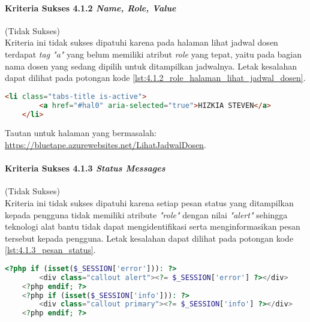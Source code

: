 \paragraph{Kriteria Sukses 4.1.2 \textit{Name, Role, Value}}
\label{par:kepatuhan_bluetape_kriteria_sukses_4.1.2}
(Tidak Sukses)\\

Kriteria ini tidak sukses dipatuhi karena pada halaman lihat jadwal dosen terdapat \textit{tag "a"} yang belum memiliki atribut \textit{role} yang tepat, yaitu pada bagian nama dosen yang sedang dipilih untuk ditampilkan jadwalnya. Letak kesalahan dapat dilihat pada potongan kode \ref{lst:4.1.2_role_halaman_lihat_jadwal_dosen}.

\begin{lstlisting}[frame=single, label={lst:4.1.2_role_halaman_lihat_jadwal_dosen}, language=HTML, caption=Kriteria Sukses 4.1.1 - Atribut \textit{Role} pada Halaman Lihat Jadwal Dosen]
    <li class="tabs-title is-active">
        <a href="#hal0" aria-selected="true">HIZKIA STEVEN</a>
    </li> 
\end{lstlisting}
Tautan untuk halaman yang bermasalah: \url{https://bluetape.azurewebsites.net/LihatJadwalDosen}.

\paragraph{Kriteria Sukses 4.1.3 \textit{Status Messages}}
\label{par:kepatuhan_bluetape_kriteria_sukses_4.1.3}
(Tidak Sukses)\\

Kriteria ini tidak sukses dipatuhi karena setiap pesan status yang ditampilkan kepada pengguna tidak memiliki atribute \textit{"role"} dengan nilai \textit{"alert"} sehingga teknologi alat bantu tidak dapat mengidentifikasi serta menginformasikan pesan tersebut kepada pengguna. Letak kesalahan dapat dilihat pada potongan kode \ref{lst:4.1.3_pesan_status}.

\begin{lstlisting}[frame=single, label={lst:4.1.3_pesan_status}, language=PHP, caption=Kriteria Sukses 4.1.3 - Atribut pada Pesan Status]
    <?php if (isset($_SESSION['error'])): ?>
        <div class="callout alert"><?= $_SESSION['error'] ?></div>
    <?php endif; ?>
    <?php if (isset($_SESSION['info'])): ?>
        <div class="callout primary"><?= $_SESSION['info'] ?></div>
    <?php endif; ?>
\end{lstlisting}